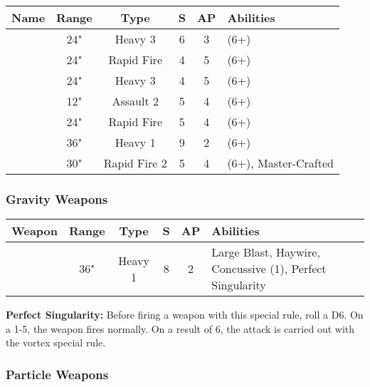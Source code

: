 \label{Gauss Cannon} \label{Gauss Blaster} \label{Gauss Flayer} \label{Gauss Flux Arcs} \label{Gauss Reaper} \label{Heavy Gauss Cannon} \label{Relic Gauss Blaster}
\noindent
\begin{NiceTabular}{m{130 pt} *{4}{c} >{\raggedright\arraybackslash}p{240pt}}
	Name & Range & Type & S & AP & Abilities \\
	\hline
	 & 24" & Heavy 3 & 6 & 3 &  (6+) \\
	  & 24" & Rapid Fire & 4 & 5 &  (6+) \\
	 & 24" & Heavy 3 & 4 & 5 &  (6+) \\
	  & 12" & Assault 2 & 5 & 4 &  (6+) \\
	 & 24" & Rapid Fire & 5 & 4 &  (6+) \\
	  & 36" & Heavy 1 & 9 & 2 &  (6+) \\
	 & 30" & Rapid Fire 2 & 5 & 4 &  (6+), Master-Crafted \\	
\end{NiceTabular}

\subsubsection{Gravity Weapons}

\label{Singulatiry Generator}
\begin{NiceTabular}{m{130 pt} *{4}{c} >{\raggedright\arraybackslash}p{240pt}}
	Weapon & Range & Type & S & AP & Abilities \\
	\hline
	 & 36" & Heavy 1 & 8 & 2 & Large Blast, Haywire, Concussive (1), Perfect Singularity  \\
\end{NiceTabular}

\vspace*{1em}
\textbf{Perfect Singularity:} Before firing a weapon with this special rule, roll a D6. On a 1-5, the weapon fires normally. On a result of 6, the attack is carried out with the vortex special rule.

\subsubsection{Particle Weapons}

